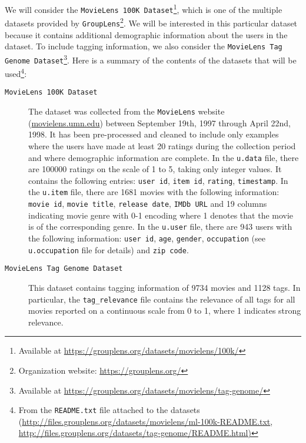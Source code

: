 \documentclass[bj, preprint]{imsart}
\begin{document}
We will consider the \texttt{MovieLens 100K Dataset}\footnote{Available at \url{https://grouplens.org/datasets/movielens/100k/}}, which is one of the multiple datasets provided by \texttt{GroupLens}\footnote{Organization website: \url{https://grouplens.org/}}. 
We will be interested in this particular dataset because it contains additional demographic information about the users in the dataset. 
To include tagging information, we also consider the \texttt{MovieLens Tag Genome Dataset}\footnote{Available at \url{https://grouplens.org/datasets/movielens/tag-genome/}}. 
Here is a summary of the contents of the datasets that will be used\footnote{From the \texttt{README.txt} file attached to the datasets (\url{http://files.grouplens.org/datasets/movielens/ml-100k-README.txt}, \url{http://files.grouplens.org/datasets/tag-genome/README.html)}}:

\begin{description}
	\item[\texttt{MovieLens 100K Dataset}] 
	The dataset was collected from the \texttt{MovieLens} website (\url{movielens.umn.edu}) between September 19th, 1997 through April 22nd, 1998. 
	It has been pre-processed and cleaned to include only examples where the users have made at least 20 ratings during the collection period and where demographic information are complete. 
	In the \texttt{u.data} file, there are \num{100000} ratings on the scale of 1 to 5, taking only integer values. 
	It contains the following entries: \texttt{user id}, \texttt{item id}, \texttt{rating}, \texttt{timestamp}. 
	In the \texttt{u.item} file, there are \num{1681} movies with the following information: \texttt{movie id}, \texttt{movie title}, \texttt{release date}, \texttt{IMDb URL} and 19 columns indicating movie genre with 0-1 encoding where 1 denotes that the movie is of the corresponding genre. 
	In the \texttt{u.user} file, there are \num{943} users with the following information: \texttt{user id}, \texttt{age}, \texttt{gender}, \texttt{occupation} (see \texttt{u.occupation} file for details) and \texttt{zip code}.
	\item[\texttt{MovieLens Tag Genome Dataset}] 
	This dataset contains tagging information of \num{9734} movies and \num{1128} tags. 
	In particular, the \texttt{tag\_relevance} file contains the relevance of all tags for all movies reported on a continuous scale from 0 to 1, where 1 indicates strong relevance.
\end{description}


\end{document}
